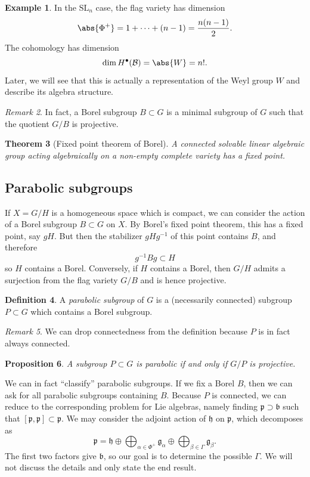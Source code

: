 \documentclass{amsart}
\newtheorem{thm}{Theorem}[section]
\newtheorem{prop}[thm]{Proposition}
\theoremstyle{definition}
\newtheorem{defn}[thm]{Definition}
\newtheorem{exm}[thm]{Example}
\theoremstyle{remark}
\newtheorem{rmk}[thm]{Remark}
\theoremstyle{plain}
\theoremstyle{definition}
\theoremstyle{remark}
\newcommand{\g}{\mathfrak{g}}
\newcommand{\h}{\mathfrak{h}}
\renewcommand{\b}{\mathfrak{b}}
\newcommand{\p}{\mathfrak{p}}
\newcommand{\mc}[1]{\mathcal{#1}}
\newcommand{\mf}[1]{\mathfrak{#1}}
\newcommand{\mr}[1]{\mathrm{#1}}
\newcommand{\1}{\mathbf{1}}
\newcommand{\2}{\mathbf{2}}
\newcommand{\3}{\mathbf{3}}
\newcommand{\SL}{\mr{SL}}
\begin{document}
\begin{exm}
    In the \(\SL_n\) case, the flag variety has dimension
    \[ \abs{\Phi^+} = 1 + \cdots + (n-1) = \frac{n(n-1)}{2}. \]
    The cohomology has dimension
    \[ \dim H^{\bullet}(\mc{B}) = \abs{W} = n!. \]
    Later, we will see that this is actually a representation of the Weyl group \(W\) and describe its algebra structure.
\end{exm}

\begin{rmk}
    In fact, a Borel subgroup \(B \subset G\) is a minimal subgroup of \(G\) such that the quotient \(G/B\) is projective. 
\end{rmk}

\begin{thm}[Fixed point theorem of Borel]
    A connected solvable linear algebraic group acting algebraically on a non-empty complete variety has a fixed point.
\end{thm}

\subsection{Parabolic subgroups}%
\label{sub:Parabolic subgroups}


If \(X = G/H\) is a homogeneous space which is compact, we can consider the action of a Borel subgroup \(B \subset G\) on \(X\). By Borel's fixed point theorem, this has a fixed point, say \(gH\). But then the stabilizer \(g H g^{-1}\) of this point contains \(B\), and therefore
\[ g^{-1} B g \subset H \]
so \(H\) contains a Borel. Conversely, if \(H\) contains a Borel, then \(G/H\) admits a surjection from the flag variety \(G/B\) and is hence projective. 

\begin{defn}
    A \textit{parabolic subgroup} of \(G\) is a (necessarily connected) subgroup \(P \subset G\) which contains a Borel subgroup.
\end{defn}

\begin{rmk}
    We can drop connectedness from the definition because \(P\) is in fact always connected.
\end{rmk}

\begin{prop}
    A subgroup \(P \subset G\) is parabolic if and only if \(G/P\) is projective.
\end{prop}

We can in fact ``classify'' parabolic subgroups. If we fix a Borel \(B\), then we can ask for all parabolic subgroups containing \(B\). Because \(P\) is connected, we can reduce to the corresponding problem for Lie algebras, namely finding \(\mf{p} \supset \b\) such that \([\p, \p] \subset \p\). We may consider the adjoint action of \(\h\) on \(\p\), which decomposes as
\[ \p = \h \oplus \bigoplus_{\alpha \in \Phi^+} \g_{\alpha} \oplus \bigoplus_{\beta \in \Gamma} \g_{\beta}. \]
The first two factors give \(\b\), so our goal is to determine the possible \(\Gamma\). We will not discuss the details and only state the end result.
\end{document}
